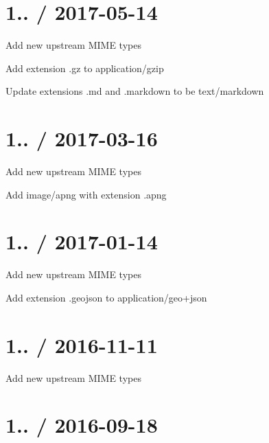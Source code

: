 \section*{1.. / 2017-\/05-\/14 }


\begin{DoxyItemize}
\item Add new upstream M\+I\+ME types
\item Add extension {\ttfamily .gz} to {\ttfamily application/gzip}
\item Update extensions {\ttfamily .md} and {\ttfamily .markdown} to be {\ttfamily text/markdown}
\end{DoxyItemize}

\section*{1.. / 2017-\/03-\/16 }


\begin{DoxyItemize}
\item Add new upstream M\+I\+ME types
\item Add {\ttfamily image/apng} with extension {\ttfamily .apng}
\end{DoxyItemize}

\section*{1.. / 2017-\/01-\/14 }


\begin{DoxyItemize}
\item Add new upstream M\+I\+ME types
\item Add extension {\ttfamily .geojson} to {\ttfamily application/geo+json}
\end{DoxyItemize}

\section*{1.. / 2016-\/11-\/11 }


\begin{DoxyItemize}
\item Add new upstream M\+I\+ME types
\end{DoxyItemize}

\section*{1.. / 2016-\/09-\/18 }


